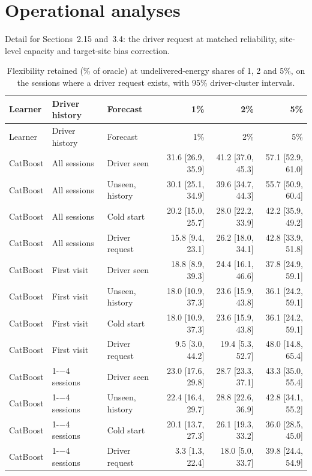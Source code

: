 \section{Operational analyses}
Detail for Sections~2.15 and~3.4: the driver request at matched reliability, site-level capacity and target-site bias correction.
{\footnotesize\begin{longtable}{lllrrr}
\caption{Flexibility retained (\% of oracle) at undelivered-energy shares of 1, 2 and 5\%, on the sessions where a driver request exists, with 95\% driver-cluster intervals.}\label{tab:s-request}\\
\toprule
Learner & Driver history & Forecast & 1\% & 2\% & 5\% \\
\midrule
\endfirsthead
\toprule
Learner & Driver history & Forecast & 1\% & 2\% & 5\% \\
\midrule
\endhead
\bottomrule
\endfoot
CatBoost & All sessions & Driver seen & 31.6 [26.9, 35.9] & 41.2 [37.0, 45.3] & 57.1 [52.9, 61.0] \\
CatBoost & All sessions & Unseen, history & 30.1 [25.1, 34.9] & 39.6 [34.7, 44.3] & 55.7 [50.9, 60.4] \\
CatBoost & All sessions & Cold start & 20.2 [15.0, 25.7] & 28.0 [22.2, 33.9] & 42.2 [35.9, 49.2] \\
CatBoost & All sessions & Driver request & 15.8 [9.4, 23.1] & 26.2 [18.0, 34.1] & 42.8 [33.9, 51.8] \\
CatBoost & First visit & Driver seen & 18.8 [8.9, 39.3] & 24.4 [16.1, 46.6] & 37.8 [24.9, 59.1] \\
CatBoost & First visit & Unseen, history & 18.0 [10.9, 37.3] & 23.6 [15.9, 43.8] & 36.1 [24.2, 59.1] \\
CatBoost & First visit & Cold start & 18.0 [10.9, 37.3] & 23.6 [15.9, 43.8] & 36.1 [24.2, 59.1] \\
CatBoost & First visit & Driver request & 9.5 [3.0, 44.2] & 19.4 [5.3, 52.7] & 48.0 [14.8, 65.4] \\
CatBoost & 1-$-$4 sessions & Driver seen & 23.0 [17.6, 29.8] & 28.7 [23.3, 37.1] & 43.3 [35.0, 55.4] \\
CatBoost & 1-$-$4 sessions & Unseen, history & 22.4 [16.4, 29.7] & 28.8 [22.6, 36.9] & 42.8 [34.1, 55.2] \\
CatBoost & 1-$-$4 sessions & Cold start & 20.1 [13.7, 27.3] & 26.1 [19.3, 33.2] & 36.0 [28.5, 45.0] \\
CatBoost & 1-$-$4 sessions & Driver request & 3.3 [1.3, 22.4] & 18.0 [5.0, 33.7] & 39.8 [24.4, 54.9] \\

\end{longtable}}
